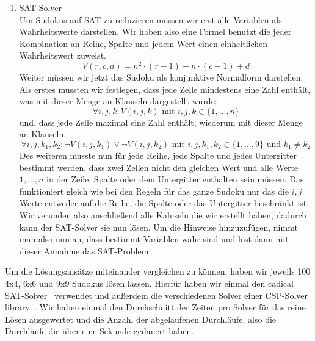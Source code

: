 \begin{enumerate}
    \item SAT-Solver \\
    Um Sudokus auf SAT zu reduzieren müssen wir erst alle Variablen als Wahrheitswerte darstellen. Wir haben also eine Formel benutzt die jeder Kombination an Reihe, Spalte und jedem Wert einen einheitlichen Wahrheitswert zuweist.
    \begin{equation}
        V(r, c, d) = n^2 \cdot (r - 1) + n \cdot (c - 1) + d
    \end{equation}
    Weiter müssen wir jetzt das Sudoku als konjunktive Normalform darstellen. 
    Als erstes mussten wir festlegen, dass jede Zelle mindestens eine Zahl enthält, was mit dieser Menge an Klauseln dargestellt wurde:
    \begin{equation}
        \forall i, j, k: V(i, j, k) \text{ mit } i, j, k \in \{1, ..., n\} %
    \end{equation}
    und, dass jede Zelle maximal eine Zahl enthält, wiederum mit dieser Menge an Klauseln.
    \begin{equation}
        \forall i, j, k_1, k_2: \neg V(i, j, k_1) \vee \neg V(i, j, k_2) \text{ mit }i, j, k_1, k_2 \in \{1, ..., 9\} \text{ und } k_1 \neq k_2 %
    \end{equation}
    Des weiteren musste nun für jede Reihe, jede Spalte und jedes Untergitter bestimmt werden, dass zwei Zellen nicht den gleichen Wert und alle Werte $1, \dots, n$ %
    in der Zeile, Spalte oder dem Untergitter enthalten sein müssen.
    Das funktioniert gleich wie bei den Regeln für das ganze Sudoku nur das die $i, j$ Werte entweder auf die Reihe, die Spalte oder das Untergitter beschränkt ist.
    Wir verunden also anschließend alle Kaluseln die wir erstellt haben, dadurch kann der SAT-Solver sie nun lösen.
    Um die Hinweise hinzuzufügen, nimmt man also nun an, dass bestimmt Variablen wahr sind und löst dann mit dieser Annahme das SAT-Problem.
\end{enumerate}

Um die Lösungsansätze miteinander vergleichen zu können, haben wir jeweils 100 4x4, 6x6 und 9x9 Sudokus lösen lassen.
Hierfür haben wir einmal den cadical SAT-Solver~\cite{pysat} verwendet und außerdem die verschiedenen Solver einer CSP-Solver library~\cite{pycsp}.
Wir haben einmal den Durchschnitt der Zeiten pro Solver für das reine Lösen ausgewertet und die Anzahl der abgelaufenen Durchläufe, also die Durchläufe die über eine Sekunde gedauert haben.


